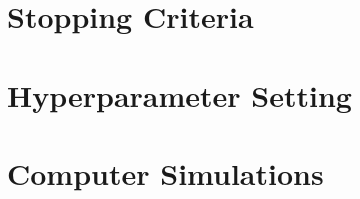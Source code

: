 \documentclass[12pt, draftclsnofoot, onecolumn]{IEEEtran}
\begin{document}
\section{Stopping Criteria}
\section{Hyperparameter Setting}
\section{Computer Simulations}


%
%



%
%
\end{document}
